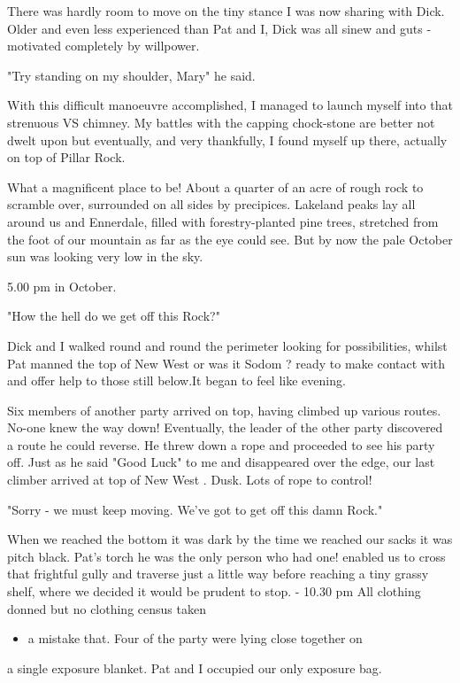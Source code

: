 \documentclass[a5paper,openany,font 10pt]{scrbook}
\begin{document}
There was hardly room to move on the tiny stance I was now
sharing with Dick. Older and even less experienced than Pat and
I, Dick was all sinew and guts - motivated completely by
willpower.

"Try standing on my shoulder, Mary" he said.

With this difficult manoeuvre accomplished, I managed to
launch myself into that strenuous VS chimney. My battles with the
capping chock-stone are better not dwelt upon but eventually, and
very thankfully, I found myself up there, actually on top of
Pillar Rock.

What a magnificent place to be! About a quarter of an acre
of rough rock to scramble over, surrounded on all sides by
precipices. Lakeland peaks lay all around us and Ennerdale,
filled with forestry-planted pine trees, stretched from the foot
of our mountain as far as the eye could see. But by now the pale
October sun was looking very low in the sky.

5.00 pm in October.

"How the hell do we get off this Rock?"

Dick and I walked round and round the perimeter looking for
possibilities, whilst Pat manned the top of    New West     or was it
   Sodom   ?  ready to make contact with and offer help to those still
below.It began to feel like evening.

Six members of another party arrived on top, having climbed
up various routes. No-one knew the way down! Eventually,  the
leader of the other party discovered a route he could reverse. He
threw down a rope and proceeded to see his party off. Just as he
said "Good Luck" to me and disappeared over the edge, our last
climber arrived at top of    New West   . Dusk. Lots of rope to
control!

"Sorry - we must keep moving. We've got to get off this damn
Rock."

When we reached the bottom it was dark  by the time we
reached our sacks it was pitch black. Pat's torch  he was the
only person who had one!  enabled us to cross that frightful
gully and traverse just a little way before reaching a tiny
grassy shelf, where we decided it would be prudent to stop.  -
10.30 pm   All clothing donned but no clothing census taken
\begin{itemize}
\item a mistake that. Four of the party were lying close together on
\end{itemize}
a single exposure blanket. Pat and I occupied our only exposure
bag.
\end{document}
